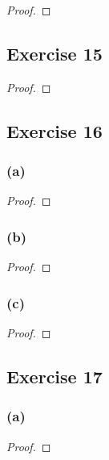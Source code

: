 \documentclass[14pt]{extarticle}
\begin{document}
\begin{proof}

\end{proof}

\subsection{Exercise 15}

\begin{proof}

\end{proof}

\subsection{Exercise 16}

\subsubsection{(a)}

\begin{proof}

\end{proof}

\subsubsection{(b)}

\begin{proof}

\end{proof}

\subsubsection{(c)}

\begin{proof}

\end{proof}

\subsection{Exercise 17}

\subsubsection{(a)}

\begin{proof}

\end{proof}
\end{document}
